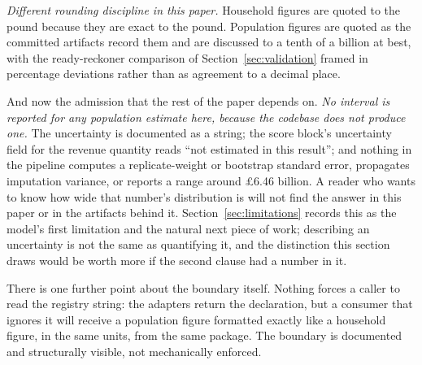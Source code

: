 \emph{Different rounding discipline in this paper.} Household figures are quoted to the pound because they are exact to the pound. Population figures are quoted as the committed artifacts record them and are discussed to a tenth of a billion at best, with the ready-reckoner comparison of Section~\ref{sec:validation} framed in percentage deviations rather than as agreement to a decimal place.

And now the admission that the rest of the paper depends on. \emph{No interval is reported for any population estimate here, because the codebase does not produce one.} The uncertainty is documented as a string; the score block's uncertainty field for the revenue quantity reads ``not estimated in this result''; and nothing in the pipeline computes a replicate-weight or bootstrap standard error, propagates imputation variance, or reports a range around \pounds 6.46 billion. A reader who wants to know how wide that number's distribution is will not find the answer in this paper or in the artifacts behind it. Section~\ref{sec:limitations} records this as the model's first limitation and the natural next piece of work; describing an uncertainty is not the same as quantifying it, and the distinction this section draws would be worth more if the second clause had a number in it.

There is one further point about the boundary itself. Nothing forces a caller to read the registry string: the adapters return the declaration, but a consumer that ignores it will receive a population figure formatted exactly like a household figure, in the same units, from the same package. The boundary is documented and structurally visible, not mechanically enforced.
